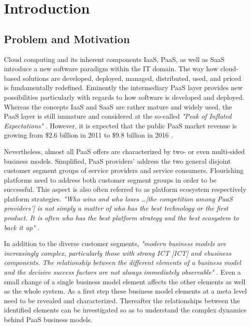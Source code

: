 \chapter{Introduction}\label{ch:intro}

\section{Problem and Motivation}\label{ch:intro:mo}


Cloud computing and its inherent components \acf{IaaS}, \acf{PaaS}, as well as \acf{SaaS} introduce a new software paradigm within the \acf{IT} domain. The way how cloud-based solutions are developed, deployed, managed, distributed, used, and priced is fundamentally redefined. Eminently the intermediary \ac{PaaS} layer provides new possibilities particularly with regards to how software is developed and deployed. Whereas the concepts \ac{IaaS} and \ac{SaaS} are rather mature and widely used, the \ac{PaaS} layer is still immature and considered at the so-called \textit{"Peak of Inflated Expectations"} \citep[p. 5]{Smith2012}. However, it is expected that the public \ac{PaaS} market revenue is growing from \$2.6 billion in 2011 to \$9.8 billion in 2016 \citep[p. 22]{Hendrick2012a}.

Nevertheless, almost all \ac{PaaS} offers are characterized by two- or even multi-sided business models. Simplified, \ac{PaaS} providers' address the two general disjoint customer segment groups of service providers and service consumers. Flourishing platforms need to address both customer segment groups in order to be successful. This aspect is also often referred to as platform ecosystem respectively platform strategies. \textit{"Who wins and who loses \ldots [the competition among \ac{PaaS} providers'] is not simply a matter of who has the best technology or the first product. It is often who has the best platform strategy and the best ecosystem to back it up"} \citep[p. 34]{Cusumano2010}.

In addition to the diverse customer segments, \textit{"modern business models are increasingly complex, particularly those with strong ICT [\acl{ICT}] and ebusiness components. The relationship between the different elements of a business model and the decisive success factors are not always immediately observable"} \citep[p. 14]{Osterwalder2005}. Even a small change of a single business model element affects the other elements as well as the whole system. As a first step these business model elements at a meta level need to be revealed and characterized. Thereafter the relationships between the identified elements can be investigated so as to understand the complex dynamics behind \ac{PaaS} business models.

